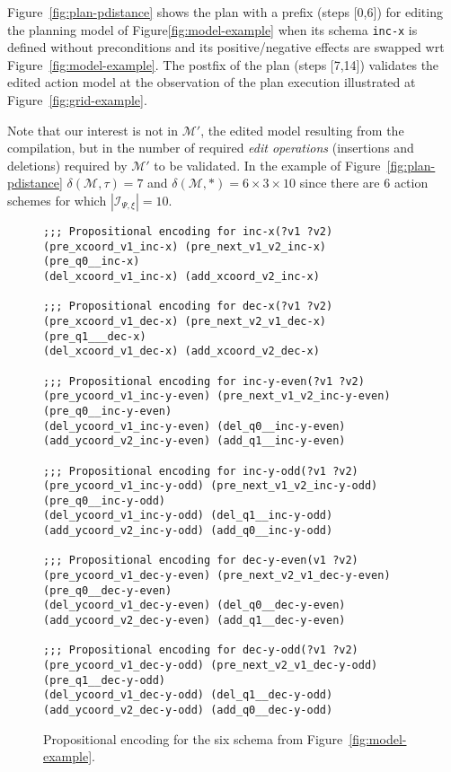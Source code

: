 \documentclass[letterpaper]{article} %
\begin{document}
Figure~\ref{fig:plan-pdistance} shows the plan with a prefix (steps [0,6]) for editing the planning model of Figure\ref{fig:model-example} when its schema {\tt\small inc-x} is defined without preconditions and its positive/negative effects are swapped wrt Figure~\ref{fig:model-example}. The postfix of the plan (steps [7,14]) validates the edited action model at the observation of the plan execution illustrated at Figure~\ref{fig:grid-example}. 

Note that our interest is not in $\mathcal{M}'$, the edited model resulting from the compilation, but in the number of required {\em edit operations} (insertions and deletions) required by $\mathcal{M}'$ to be validated. In the example of Figure~\ref{fig:plan-pdistance} $\delta(\mathcal{M},\tau)=7$ and $\delta(\mathcal{M},*)=6\times 3\times 10$ since there are 6 action schemes for which $|{\mathcal I}_{\Psi,\xi}|=10$.

\begin{figure}
\begin{tiny}
\begin{verbatim}
;;; Propositional encoding for inc-x(?v1 ?v2)
(pre_xcoord_v1_inc-x) (pre_next_v1_v2_inc-x) 
(pre_q0__inc-x)
(del_xcoord_v1_inc-x) (add_xcoord_v2_inc-x)

;;; Propositional encoding for dec-x(?v1 ?v2)
(pre_xcoord_v1_dec-x) (pre_next_v2_v1_dec-x) 
(pre_q1___dec-x)
(del_xcoord_v1_dec-x) (add_xcoord_v2_dec-x)

;;; Propositional encoding for inc-y-even(?v1 ?v2)
(pre_ycoord_v1_inc-y-even) (pre_next_v1_v2_inc-y-even)
(pre_q0__inc-y-even)
(del_ycoord_v1_inc-y-even) (del_q0__inc-y-even)
(add_ycoord_v2_inc-y-even) (add_q1__inc-y-even)

;;; Propositional encoding for inc-y-odd(?v1 ?v2)
(pre_ycoord_v1_inc-y-odd) (pre_next_v1_v2_inc-y-odd) 
(pre_q0__inc-y-odd)
(del_ycoord_v1_inc-y-odd) (del_q1__inc-y-odd)
(add_ycoord_v2_inc-y-odd) (add_q0__inc-y-odd)

;;; Propositional encoding for dec-y-even(v1 ?v2)
(pre_ycoord_v1_dec-y-even) (pre_next_v2_v1_dec-y-even)
(pre_q0__dec-y-even)
(del_ycoord_v1_dec-y-even) (del_q0__dec-y-even)
(add_ycoord_v2_dec-y-even) (add_q1__dec-y-even)

;;; Propositional encoding for dec-y-odd(?v1 ?v2)
(pre_ycoord_v1_dec-y-odd) (pre_next_v2_v1_dec-y-odd)
(pre_q1__dec-y-odd)
(del_ycoord_v1_dec-y-odd) (del_q1__dec-y-odd)
(add_ycoord_v2_dec-y-odd) (add_q0__dec-y-odd)
\end{verbatim}
\end{tiny}
 \caption{\small Propositional encoding for the six schema from Figure~\ref{fig:model-example}.}
\label{fig:encoding}
\end{figure}
\end{document}
